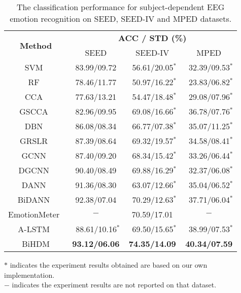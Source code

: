 \documentclass[journal]{IEEEtran}
\begin{document}
\begin{table}[htb]
	\caption{The classification performance for subject-dependent EEG emotion recognition on SEED, SEED-IV and MPED datasets.}
	\centering
	\renewcommand{\arraystretch}{1.3}
	\begin{threeparttable}		
		\begin{tabular}{|c|c|c|c|} \hline
			\multirow{2}{*}{\textbf{Method}} & \multicolumn{3}{c|}{\textbf{ACC / STD (\%)}} \\ \cline{2-4}
			&  SEED            & SEED-IV          &   MPED\\ \hline
			SVM~\cite{suykens1999least}          & 83.99/09.72      & ~56.61/20.05$^*$&~32.39/09.53$^*$\\ \hline
			RF~\cite{breiman2001random}           & 78.46/11.77      & ~50.97/16.22$^*$&~23.83/06.82$^*$\\ \hline
			CCA~\cite{thompson2005canonical}          & 77.63/13.21      & ~54.47/18.48$^*$&~29.08/07.96$^*$\\ \hline
			GSCCA~\cite{zheng2016Multichannel}        & 82.96/09.95      & ~69.08/16.66$^*$&~36.78/07.76$^*$\\ \hline
			DBN~\cite{zheng2015investigating}          & 86.08/08.34      & ~66.77/07.38$^*$&~35.07/11.25$^*$\\ \hline
			GRSLR~\cite{li2018eeg}        & 87.39/08.64      & ~69.32/19.57$^*$&~34.58/08.41$^*$\\ \hline
			GCNN~\cite{defferrard2016convolutional}         & 87.40/09.20      & ~68.34/15.42$^*$&~33.26/06.44$^*$\\ \hline
			DGCNN~\cite{song2018eeg}        & 90.40/08.49      & ~69.88/16.29$^*$&~32.37/06.08$^*$\\ \hline
			DANN~\cite{ganin2016domain}         & 91.36/08.30      & ~63.07/12.66$^*$&~35.04/06.52$^*$\\ \hline
			BiDANN~\cite{li2018novel}       & 92.38/07.04      & ~70.29/12.63$^*$&~37.71/06.04$^*$\\ \hline
			EmotionMeter~\cite{zheng2018emotionmeter}     & $-$              & 70.59/17.01     &$-$             \\ \hline
			A-LSTM~\cite{8606087}       &~88.61/10.16$^*$  & ~69.50/15.65$^*$&~38.99/07.53$^*$\\ \hline
			BiHDM    &\textbf{93.12/06.06} &\textbf{74.35/14.09}&\textbf{40.34/07.59}   \\ \hline
		\end{tabular}
		\begin{tablenotes}[para]
			\footnotesize $*$ indicates the experiment results obtained are based on our own implementation.\\
			$-$ indicates the experiment results are not reported on that dataset.
		\end{tablenotes}
	\end{threeparttable}
	\label{Table: dep}
\end{table}
\end{document}

